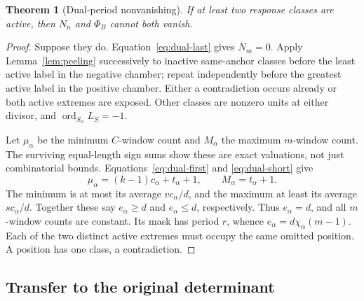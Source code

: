 \documentclass[11pt,a4paper]{amsart}
\numberwithin{equation}{section}
\theoremstyle{plain}
\newtheorem{theorem}{Theorem}[section]
\theoremstyle{definition}
\begin{document}
\begin{theorem}[Dual-period nonvanishing]\label{thm:dual-period}
If at least two response classes are active, then \(N_n\) and \(\Phi_B\) cannot both vanish.
\end{theorem}
\begin{proof}
Suppose they do.  Equation~\eqref{eq:dual-last} gives \(N_m=0\).  Apply Lemma~\ref{lem:peeling} successively to inactive same-anchor classes before the least active label in the negative chamber; repeat independently before the greatest active label in the positive chamber.  Either a contradiction occurs already or both active extremes are exposed.  Other classes are nonzero units at either divisor, and \(\operatorname{ord}_{S_\alpha}L_S=-1\).

Let \(\mu_\alpha\) be the minimum \(C\)-window count and \(M_\alpha\) the maximum \(m\)-window count.  The surviving equal-length sign sums show these are exact valuations, not just combinatorial bounds.  Equations~\eqref{eq:dual-first} and \eqref{eq:dual-short} give
\[
 \mu_\alpha=(k-1)c_\alpha+t_\alpha+1,
 \qquad M_\alpha=t_\alpha+1.
\]
The minimum is at most its average \(vc_\alpha/d\), and the maximum at least its average \(sc_\alpha/d\).  Together these say \(e_\alpha\ge d\) and \(e_\alpha\le d\), respectively.  Thus \(e_\alpha=d\), and all \(m\)-window counts are constant.  Its mask has period \(r\), whence \(e_\alpha=d\chi_\alpha(m-1)\).  Each of the two distinct active extremes must occupy the same omitted position.  A position has one class, a contradiction.
\end{proof}

\subsection{Transfer to the original determinant}
\end{document}
